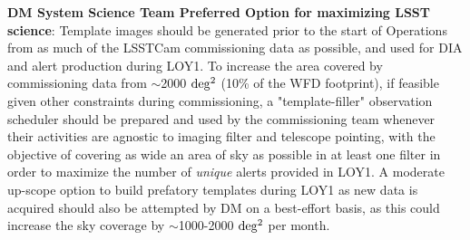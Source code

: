\documentclass[DM,lsstdraft,toc]{lsstdoc}
\begin{document}
{\bf DM System Science Team Preferred Option for maximizing LSST science}: Template images should be generated prior to the start of Operations from as much of the LSSTCam commissioning data as possible, and used for DIA and alert production during LOY1.
To increase the area covered by commissioning data from $\sim$2000 $\rm deg^2$ (10\% of the WFD footprint), if feasible given other constraints during commissioning, a "template-filler" observation scheduler should be prepared and used by the commissioning team whenever their activities are agnostic to imaging filter and telescope pointing, with the objective of covering as wide an area of sky as possible in at least one filter in order to maximize the number of {\em unique} alerts provided in LOY1.
A moderate up-scope option to build prefatory templates during LOY1 as new data is acquired should also be attempted by DM on a best-effort basis, as this could increase the sky coverage by $\sim$1000-2000 $\rm deg^2$ per month.

\clearpage





\end{document}
